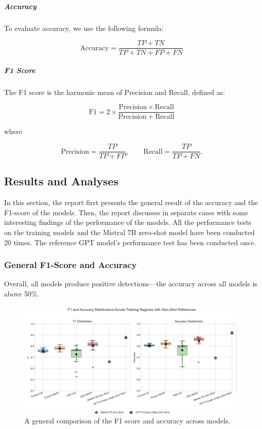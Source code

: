 \documentclass[12pt]{article}
\begin{document}
\subparagraph{Accuracy}
To evaluate accuracy, we use the following formula:

\begin{equation}
\mathrm{Accuracy} = \frac{TP + TN}{TP + TN + FP + FN}
\end{equation}

\subparagraph{F1 Score}
The F1 score is the harmonic mean of Precision and Recall, defined as:

\begin{equation}
\mathrm{F1} = 2 \times \frac{\mathrm{Precision} \times \mathrm{Recall}}{\mathrm{Precision} + \mathrm{Recall}}
\end{equation}

where

\begin{equation}
\mathrm{Precision} = \frac{TP}{TP + FP}, 
\qquad
\mathrm{Recall} = \frac{TP}{TP + FN}.
\end{equation}

\subsection{Results and Analyses}
In this section, the report first presents the general result of the accuracy and the F1-score of the models. Then, the report discusses in separate cases with some interesting findings of the performance of the models. All the performance tests on the training models and the Mistral 7B zero-shot model have been conducted 20 times. The reference GPT model's performance test has been conducted once.

\subsubsection{General F1-Score and Accuracy}

Overall, all models produce positive detections\;---\;the accuracy across all models is above 50\%.

\begin{figure}[H]
  \begin{adjustwidth}{-2cm}{0cm}
  \centering
  \includegraphics[width=1.3\textwidth]{figures/Accuracy_distribution_4settings.png}
  \caption{A general comparison of the F1 score and accuracy across models.}
  \label{fig:total-comparison}
  \end{adjustwidth}
\end{figure}
\end{document}
